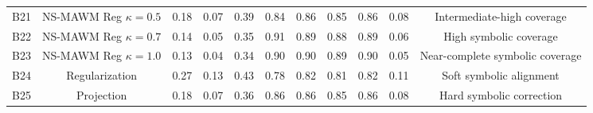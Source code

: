 \begin{table}[h!]
{\begin{tabular}{lcccccccccc}
            B21                      &
            NS-MAWM Reg $\kappa=0.5$ &
            0.18                     &
            0.07                     &
            0.39                     &
            0.84                     &
            0.86                     &
            0.85                     &
            0.86                     &
            0.08                     &
            Intermediate-high coverage
            \\

            B22                      &
            NS-MAWM Reg $\kappa=0.7$ &
            0.14                     &
            0.05                     &
            0.35                     &
            0.91                     &
            0.89                     &
            0.88                     &
            0.89                     &
            0.06                     &
            High symbolic coverage
            \\

            B23                      &
            NS-MAWM Reg $\kappa=1.0$ &
            0.13                     &
            0.04                     &
            0.34                     &
            0.90                     &
            0.90                     &
            0.89                     &
            0.90                     &
            0.05                     &
            Near-complete symbolic coverage
            \\

            \midrule

            B24                      &
            Regularization           &
            0.27                     &
            0.13                     &
            0.43                     &
            0.78                     &
            0.82                     &
            0.81                     &
            0.82                     &
            0.11                     &
            Soft symbolic alignment
            \\

            B25                      &
            Projection               &
            0.18                     &
            0.07                     &
            0.36                     &
            0.86                     &
            0.86                     &
            0.85                     &
            0.86                     &
            0.08                     &
            Hard symbolic correction
            \\


\end{tabular}}
\end{table}
